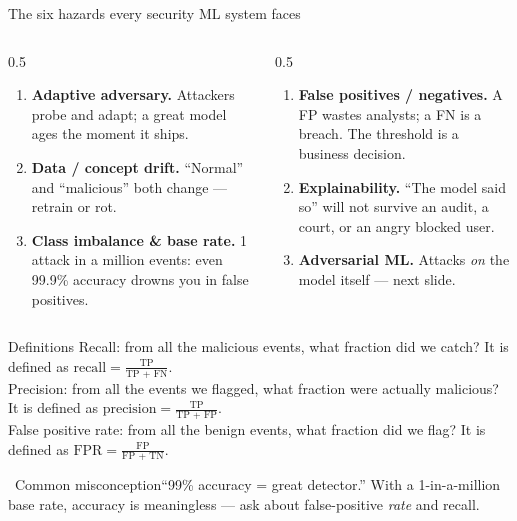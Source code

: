 \documentclass[aspectratio=169,10pt]{beamer}
\newcommand{\term}[1]{{\color{mlink}\textbf{#1}}}         %
\newcommand{\myth}[1]{%
  \begin{alertblock}{\small\ding{55}\ Common misconception}\small #1\end{alertblock}}
\begin{document}
\begin{frame}{The six hazards every security ML system faces}
  \footnotesize
  \begin{columns}[T]
    \begin{column}{0.5\textwidth}
      \begin{enumerate}\setlength\itemsep{3pt}
        \item \term{Adaptive adversary.} Attackers probe and adapt; a great model
              ages the moment it ships.
        \item \term{Data / concept drift.} ``Normal'' and ``malicious'' both
              change --- retrain or rot.
        \item \term{Class imbalance \& base rate.} 1 attack in a million events:
              even 99.9\% accuracy drowns you in false positives.
      \end{enumerate}
    \end{column}
    \begin{column}{0.5\textwidth}
      \begin{enumerate}\setlength\itemsep{3pt}\setcounter{enumi}{3}
        \item \term{False positives / negatives.} A FP wastes analysts; a FN is a
              breach. The threshold is a business decision.
        \item \term{Explainability.} ``The model said so'' will not survive an
              audit, a court, or an angry blocked user.
        \item \term{Adversarial ML.} Attacks \emph{on} the model itself
              --- next slide.
      \end{enumerate}
    \end{column}
  \end{columns}
  \vfill
    \begin{block}{Definitions}
    Recall: from all the malicious events, what fraction did we catch? It is defined as $\text{recall} = \frac{\text{TP}}{\text{TP + FN}}$.\\
    Precision: from all the events we flagged, what fraction were actually malicious? It is defined as $\text{precision} = \frac{\text{TP}}{\text{TP + FP}}$.\\
    False positive rate: from all the benign events, what fraction did we flag? It is defined as $\text{FPR} = \frac{\text{FP}}{\text{FP + TN}}$.
  \end{block}
  \myth{``99\% accuracy = great detector.'' With a 1-in-a-million base rate,
  accuracy is meaningless --- ask about false-positive \emph{rate} and recall.}


\end{frame}
\end{document}
